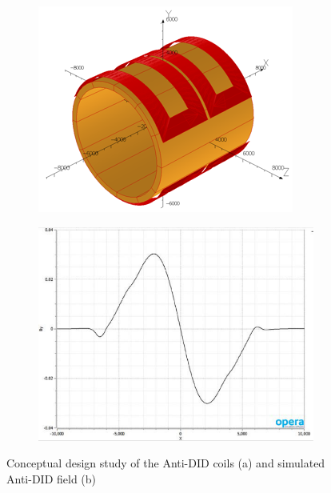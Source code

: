 \begin{figure}[h!]
\begin{subfigure}{0.49\hsize} \includegraphics[width=\textwidth]{Integration/fig/Anti-DID.png}
\caption{ \label{ild:fig:anti_did_mechanics}}
 \end{subfigure}
\begin{subfigure}{0.49\hsize} \includegraphics[width=\textwidth]{Integration/fig/Anti-DID_Field.pdf}
\caption{  \label{ild:fig:anti-did-field}}
 \end{subfigure}
\caption{Conceptual design study of the Anti-DID coils (a) and simulated Anti-DID field (b)~\cite{ild:bib:anti-did-design}}
\label{ILD:fig:anti_did_design}
\end{figure}

